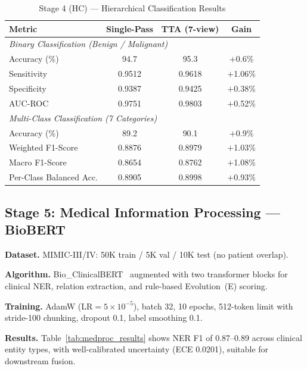 \documentclass[conference]{IEEEtran}
\begin{document}
\begin{table}[h]
\centering
\small
\renewcommand{\arraystretch}{1.2}
\caption{Stage 4 (HC) --- Hierarchical Classification Results}
\label{tab:hc_results}
\setlength{\tabcolsep}{5pt}
\begin{tabular}{l c c c}
\toprule
\textbf{Metric} & \textbf{Single-Pass} & \textbf{TTA (7-view)} & \textbf{Gain} \\
\midrule
\multicolumn{4}{l}{\textit{Binary Classification (Benign / Malignant)}} \\
\midrule
Accuracy (\%)        & 94.7   & 95.3   & $+$0.6\%  \\
Sensitivity          & 0.9512 & 0.9618 & $+$1.06\% \\
Specificity          & 0.9387 & 0.9425 & $+$0.38\% \\
AUC-ROC              & 0.9751 & 0.9803 & $+$0.52\% \\
\midrule
\multicolumn{4}{l}{\textit{Multi-Class Classification (7 Categories)}} \\
\midrule
Accuracy (\%)              & 89.2   & 90.1   & $+$0.9\%  \\
Weighted F1-Score          & 0.8876 & 0.8979 & $+$1.03\% \\
Macro F1-Score             & 0.8654 & 0.8762 & $+$1.08\% \\
Per-Class Balanced Acc.    & 0.8905 & 0.8998 & $+$0.93\% \\
\bottomrule
\end{tabular}
\end{table}

\subsection{Stage 5: Medical Information Processing --- BioBERT}

\textbf{Dataset.} MIMIC-III/IV: 50K train / 5K val / 10K test (no
patient overlap).

\textbf{Algorithm.} Bio\_ClinicalBERT~\cite{alsentzer2019_bioclinicalbert}
augmented with two transformer blocks for clinical NER, relation
extraction, and rule-based Evolution~(E) scoring.

\textbf{Training.} AdamW ($\mathrm{LR}=5{\times}10^{-5}$), batch 32,
10 epochs, 512-token limit with stride-100 chunking, dropout 0.1,
label smoothing 0.1.

\textbf{Results.} Table~\ref{tab:medproc_results} shows NER F1 of
0.87--0.89 across clinical entity types, with well-calibrated
uncertainty (ECE 0.0201), suitable for downstream fusion.
\end{document}
